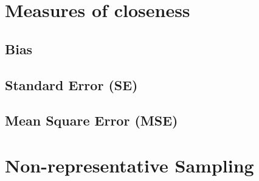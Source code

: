 



    










\section{Measures of closeness}\label{Sampling Plans/Measures of closeness}



\subsection{Bias}\label{Sampling Plans/Measures of closeness/Bias}




\subsection{Standard Error (SE)}\label{Sampling Plans/Measures of closeness/Standard Error (SE)}





\subsection{Mean Square Error (MSE)}\label{Sampling Plans/Measures of closeness/Mean Square Error (MSE)}












\section{Non-representative Sampling \cite{statistics/book/Statistics-for-Data-Scientists/Maurits-Kaptein}}\label{Sampling Plans/Non-representative Sampling}


